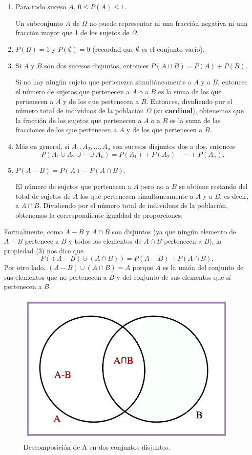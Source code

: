\documentclass[
]{book}
\theoremstyle{definition}
\theoremstyle{definition}
\theoremstyle{definition}
\theoremstyle{definition}
\theoremstyle{remark}
\begin{document}
\begin{enumerate}
\def\labelenumi{\arabic{enumi}.}
\item
  Para todo suceso \(A\), \(0\leqslant P(A)\leqslant 1\).

  Un subconjunto \(A\) de \(\Omega\) no puede representar ni una fracción negativa ni una fracción mayor que 1 de los sujetos de \(\Omega\).
\item
  \(P(\Omega)=1\) y \(P(\emptyset)=0\) (recordad que \(\emptyset\) es el conjunto vacío).
\item
  Si \(A\) y \(B\) son dos sucesos disjuntos, entonces \(P(A\cup B)=P(A)+P(B)\).

  Si no hay ningún sujeto que pertenezca simultáneamente a \(A\) y a \(B\), entonces el número de sujetos que pertenecen a \(A\) o a \(B\) es la suma de los que pertenecen a \(A\) y de los que pertenecen a \(B\). Entonces, dividiendo por el número total de individuos de la población \(\Omega\) (su \textbf{cardinal}), obtenemos que la fracción de los sujetos que pertenecen a \(A\) o a \(B\) es la suma de las fracciones de los que pertenecen a \(A\) y de los que pertenecen a \(B\).
\item
  Más en general, si \(A_1,A_2,\ldots,A_n\) son sucesos disjuntos dos a dos, entonces
  \[
  P(A_1\cup A_2\cup \cdots \cup A_n)=P(A_1)+P(A_2)+\cdots +P(A_n).
  \]
\item
  \(P(A-B)=P(A)-P(A\cap B)\).

  El número de sujetos que pertenecen a \(A\) pero no a \(B\) se obtiene restando del total de sujetos de \(A\) los que pertenecen simultáneamente a \(A\) y a \(B\), es decir, a \(A\cap B\). Dividiendo por el número total de individuos de la población, obtenemos la correspondiente igualdad de proporciones.
\end{enumerate}

\begin{rmdcorbes}
Formalmente, como \(A-B\) y \(A\cap B\) son disjuntos (ya que ningún elemento de \(A-B\) pertenece a \(B\) y todos los elementos de \(A\cap B\) pertenecen a \(B\)), la propiedad (3) nos dice que
\[
P((A-B)\cup (A\cap B))=P(A-B)+P(A\cap B).
\]
Por otro lado, \((A-B)\cup (A\cap B)=A\) porque \(A\) es la unión del conjunto de sus elementos que no pertenecen a \(B\) y del conjunto de sus elementos que sí pertenecen a \(B\).
\end{rmdcorbes}

\begin{figure}

{\centering \includegraphics[width=0.5\linewidth]{INREMDN_files/figure-html/A-B2} 

}

\caption{Descomposición de A en dos conjuntos disjuntos.}\label{fig:AmenysB2}
\end{figure}
\end{document}
